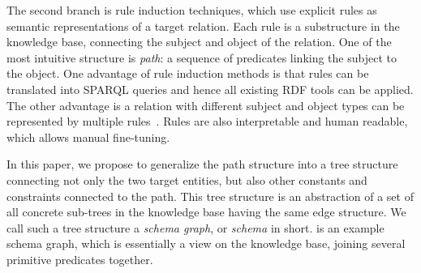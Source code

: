 The second branch is rule induction techniques, which use explicit rules
as semantic representations of a target relation.
Each rule is a substructure in the knowledge base, 
connecting the subject and object of the relation.
One of the most intuitive structure is {\em path}: a sequence of predicates
linking the subject to the object.
One advantage of rule induction methods is that 
rules can be translated into SPARQL queries and
hence all existing RDF tools can be applied.
The other advantage is a relation with different subject and object types
can be represented by multiple rules~\cite{luo2015inferring}.
Rules are also interpretable and human readable, 
which allows manual fine-tuning.

In this paper, we propose to generalize the path structure
into a tree structure connecting not only the two target entities, but also
other constants and constraints connected to the path.
This tree structure is an abstraction of a set of all
concrete sub-trees in the knowledge base having the same edge
structure.
We call such a tree structure a {\em schema graph}, or {\em schema}
in short.   is an example schema graph,
which is essentially a view on the knowledge base,
joining several primitive predicates together.

